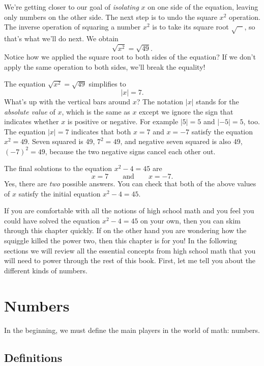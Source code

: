 	We're getting closer to our goal of \emph{isolating} $x$ on one side of the equation,							
	leaving only numbers on the other side.
	The next step is to undo the square $x^2$ operation.
	The inverse operation of squaring a number $x^2$ is to take its square root $\sqrt{\phantom{a}\; }$,
	so that's what we'll do next. We obtain
	\[ 
	   \sqrt{x^2} 		= 	\sqrt{49}.
	\]
	Notice how we applied the square root  to both sides of the equation? 
	If we don't apply the same operation to both sides, we'll break the equality!

	The equation $\sqrt{x^2}= \sqrt{49}$ simplifies to 
	\[
	 	|x|	= 	7.
	 \]
	What's up with the vertical bars around $x$?
	The notation $|x|$ stands for the \emph{absolute value} of $x$,											
	which is the same as $x$ except we ignore the sign that indicates whether $x$ is positive or negative. 
	For example $|5|=5$ and $|-5|=5$, too.
	The equation $|x|=7$ indicates that both $x=7$ and $x=-7$ satisfy the equation $x^2 = 49$.
	Seven squared is 49, $7^2=49$, and negative seven squared is also 49, $(-7)^2 = 49$,
	because the two negative signs cancel each other out.

	The final solutions to the equation $x^2-4=45$ are													
	\[
	 x  = 7 \qquad \textrm{and} \qquad   x=  - 7.
	\]
	Yes, there are \emph{two} possible answers. 
	You can check that both of the above values of $x$ satisfy the initial equation $x^2-4=45$.

	\bigskip

	If you are comfortable with all the notions of high school math
	and you feel you could have solved the equation $x^2-4=45$ on your own,			then you can skim through this chapter quickly.
	If on the other hand you are wondering how the squiggle killed the power two,
	then this chapter is for you!
	In the following sections we will review all the essential concepts from
	high school math that you will need to power through the rest of this book.
	First, let me tell you about the different kinds of numbers.


\section{Numbers}
\label{sec:numbers}

	In the beginning, we must define the main players in the world of math: numbers.

	\subsection{Definitions}
	\label{numbers:definitions}
		
